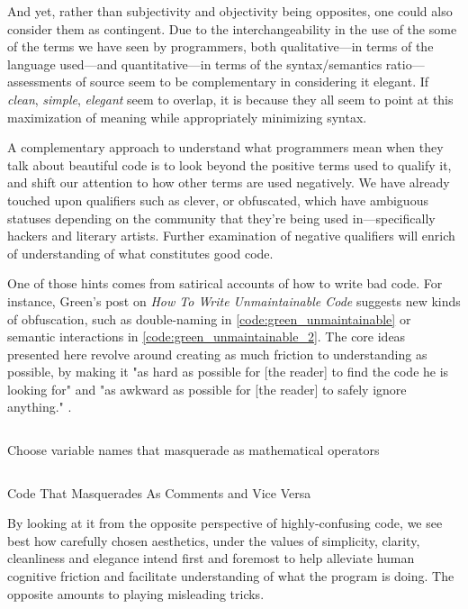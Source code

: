 And yet, rather than subjectivity and objectivity being opposites, one could also consider them as contingent. Due to the interchangeability in the use of the some of the terms we have seen by programmers, both qualitative—in terms of the language used—and quantitative—in terms of the syntax/semantics ratio—assessments of source seem to be complementary in considering it elegant. If \emph{clean}, \emph{simple}, \emph{elegant} seem to overlap, it is because they all seem to point at this maximization of meaning while appropriately minimizing syntax.

A complementary approach to understand what programmers mean when they talk about beautiful code is to look beyond the positive terms used to qualify it, and shift our attention to how other terms are used negatively. We have already touched upon qualifiers such as clever, or obfuscated, which have ambiguous statuses depending on the community that they're being used in—specifically hackers and literary artists. Further examination of negative qualifiers will enrich of understanding of what constitutes good code.

One of those hints comes from satirical accounts of how to write bad code. For instance, Green's post on \emph{ How To Write Unmaintainable Code} suggests new kinds of obfuscation, such as double-naming in \ref{code:green_unmaintainable} or semantic interactions in \ref{code:green_unmaintainable_2}. The core ideas presented here revolve around creating as much friction to understanding as possible, by making it "as hard as possible for [the reader] to find the code he is looking for" and "as awkward as possible for [the reader] to safely ignore anything." \citep{green_how_2006}.

\begin{listing}
  \inputminted{python}{./corpus/unmaintainable.py}
  \caption{Choose variable names that masquerade as mathematical operators}
  \label{code:green_unmaintainable}
\end{listing}

\begin{listing}
\inputminted{c}{./corpus/unmaintainable_2.c}
  \caption{Code That Masquerades As Comments and Vice Versa}
  \label{code:green_unmaintainable_2}
\end{listing}

By looking at it from the opposite perspective of highly-confusing code, we see best how carefully chosen aesthetics, under the values of simplicity, clarity, cleanliness and elegance intend first and foremost to help alleviate human cognitive friction and facilitate understanding of what the program is doing. The opposite amounts to playing misleading tricks.

